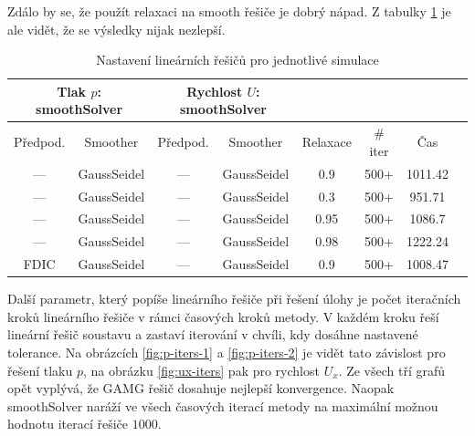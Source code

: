 \documentclass[a4paper,12pt]{report}
\theoremstyle{remark}
\begin{document}
Zdálo by se, že použít relaxaci na  smooth řešiče je dobrý nápad. Z tabulky \ref{table:solvers_set3}  je ale vidět, že se výsledky nijak nezlepší.

\begin{table}[H]
	\centering
	\caption{Nastavení lineárních řešičů pro jednotlivé simulace}
	\renewcommand{\arraystretch}{1.9}
	\begin{tabular}{*8c}
		\toprule
		\multicolumn{2}{c}{Tlak $p$: \textbf{smoothSolver}} & \multicolumn{2}{c}{Rychlost $U$: \textbf{smoothSolver}}\\
		\midrule
		Předpod.&Smoother&Předpod.&Smoother&Relaxace& \# iter&Čas\\
		\midrule
		--- & GaussSeidel &   --- & GaussSeidel &0.9&500+&1011.42\\
		--- & GaussSeidel &  --- & GaussSeidel &0.3&500+&951.71\\
		--- & GaussSeidel &   --- & GaussSeidel &0.95&500+&1086.7\\
		--- & GaussSeidel &  --- & GaussSeidel &0.98&500+&1222.24\\
		FDIC & GaussSeidel &  --- & GaussSeidel &0.9&500+&1008.47\\
		\bottomrule
	\end{tabular}
	
	\label{table:solvers_set3}
\end{table}

Další parametr, který popíše  lineárního řešiče při řešení úlohy je počet iteračních kroků lineárního řešiče v rámci časových kroků metody. V každém kroku řeší lineární řešič soustavu a zastaví iterování v chvíli, kdy dosáhne nastavené tolerance. Na obrázcích \ref{fig:p-iters-1} a \ref{fig:p-iters-2} je vidět tato závislost pro řešení tlaku $p$, na obrázku \ref{fig:ux-iters} pak pro rychlost $U_x$. Ze všech tří grafů opět vyplývá, že GAMG řešič dosahuje nejlepší konvergence. Naopak smoothSolver naráží ve všech časových iterací metody na maximální možnou hodnotu iterací řešiče $1000$.
\end{document}

